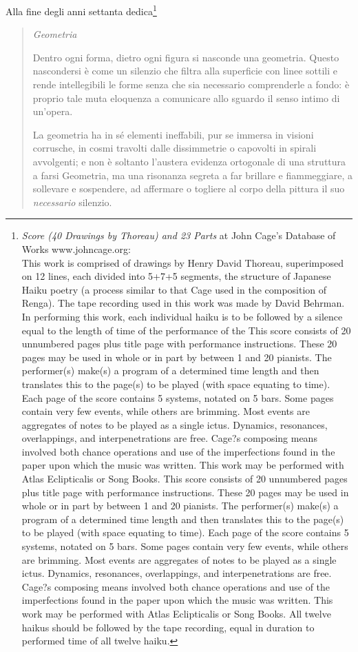 Alla fine degli anni settanta dedica\footnote{\emph{Score (40 Drawings by Thoreau) and 23 Parts} at John Cage's Database of Works www.johncage.org:\\ This work is comprised of drawings by Henry David Thoreau, superimposed on 12 lines, each divided into 5+7+5 segments, the structure of Japanese Haiku poetry (a process similar to that Cage used in the composition of Renga). The tape recording used in this work was made by David Behrman. In performing this work, each individual haiku is to be followed by a silence equal to the length of time of the performance of the This score consists of 20 unnumbered pages plus title page with performance instructions. These 20 pages may be used in whole or in part by between 1 and 20 pianists. The performer(s) make(s) a program of a determined time length and then translates this to the page(s) to be played (with space equating to time). Each page of the score contains 5 systems, notated on 5 bars. Some pages contain very few events, while others are brimming. Most events are aggregates of notes to be played as a single ictus. Dynamics, resonances, overlappings, and interpenetrations are free. Cage?s composing means involved both chance operations and use of the imperfections found in the paper upon which the music was written. This work may be performed with Atlas Eclipticalis or Song Books. This score consists of 20 unnumbered pages plus title page with performance instructions. These 20 pages may be used in whole or in part by between 1 and 20 pianists. The performer(s) make(s) a program of a determined time length and then translates this to the page(s) to be played (with space equating to time). Each page of the score contains 5 systems, notated on 5 bars. Some pages contain very few events, while others are brimming. Most events are aggregates of notes to be played as a single ictus. Dynamics, resonances, overlappings, and interpenetrations are free. Cage?s composing means involved both chance operations and use of the imperfections found in the paper upon which the music was written. This work may be performed with Atlas Eclipticalis or Song Books. All twelve haikus should be followed by the tape recording, equal in duration to performed time of all twelve haiku.}

\begin{quote}
	\emph{Geometria}

	Dentro ogni forma, dietro ogni figura si nasconde una geometria. Questo nascondersi \`e come
	un silenzio che filtra alla superficie con linee sottili e rende intellegibili le forme
	senza che sia necessario comprenderle a fondo: \`e proprio tale muta eloquenza a comunicare
	allo sguardo il senso intimo di un'opera.

	La geometria ha in s\'e elementi ineffabili, pur se immersa in visioni corrusche, in cosmi
	travolti dalle dissimmetrie o capovolti in spirali avvolgenti; e non \`e soltanto
	l'austera evidenza ortogonale di una struttura a farsi Geometria, ma una risonanza segreta
	a far brillare e fiammeggiare, a sollevare e sospendere, ad affermare o togliere al
	corpo della pittura il suo \emph{necessario} silenzio.
\end{quote}

